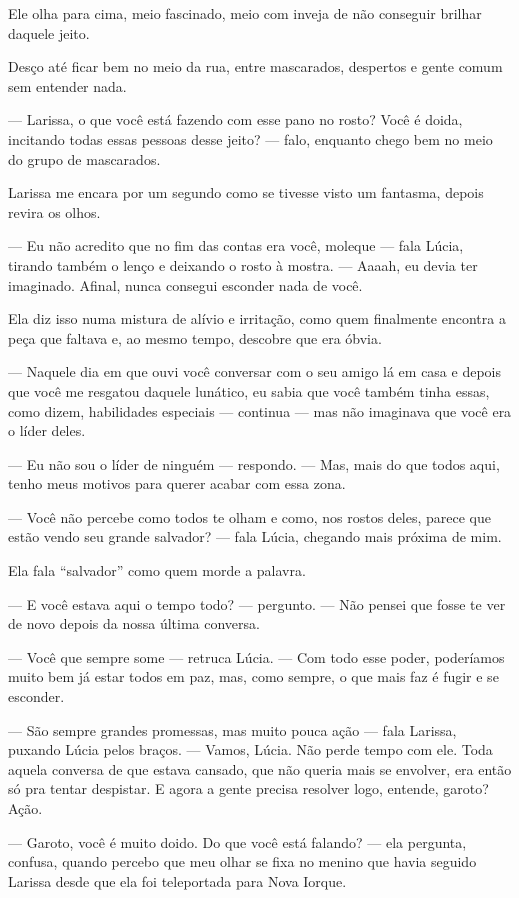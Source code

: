 Ele olha para cima, meio fascinado, meio com inveja de não conseguir brilhar daquele jeito.

\bigskip

Desço até ficar bem no meio da rua, entre mascarados, despertos e gente comum sem entender nada.

— Larissa, o que você está fazendo com esse pano no rosto? Você é doida, incitando todas essas pessoas desse jeito? — falo, enquanto chego bem no meio do grupo de mascarados.

Larissa me encara por um segundo como se tivesse visto um fantasma, depois revira os olhos.

— Eu não acredito que no fim das contas era você, moleque — fala Lúcia, tirando também o lenço e deixando o rosto à mostra. — Aaaah, eu devia ter imaginado. Afinal, nunca consegui esconder nada de você.

Ela diz isso numa mistura de alívio e irritação, como quem finalmente encontra a peça que faltava e, ao mesmo tempo, descobre que era óbvia.

— Naquele dia em que ouvi você conversar com o seu amigo lá em casa e depois que você me resgatou daquele lunático, eu sabia que você também tinha essas, como dizem, habilidades especiais — continua — mas não imaginava que você era o líder deles.

— Eu não sou o líder de ninguém — respondo. — Mas, mais do que todos aqui, tenho meus motivos para querer acabar com essa zona.

— Você não percebe como todos te olham e como, nos rostos deles, parece que estão vendo seu grande salvador? — fala Lúcia, chegando mais próxima de mim.

Ela fala “salvador” como quem morde a palavra.

— E você estava aqui o tempo todo? — pergunto. — Não pensei que fosse te ver de novo depois da nossa última conversa.

— Você que sempre some — retruca Lúcia. — Com todo esse poder, poderíamos muito bem já estar todos em paz, mas, como sempre, o que mais faz é fugir e se esconder.

— São sempre grandes promessas, mas muito pouca ação — fala Larissa, puxando Lúcia pelos braços. — Vamos, Lúcia. Não perde tempo com ele. Toda aquela conversa de que estava cansado, que não queria mais se envolver, era então só pra tentar despistar. E agora a gente precisa resolver logo, entende, garoto? Ação.

— Garoto, você é muito doido. Do que você está falando? — ela pergunta, confusa, quando percebo que meu olhar se fixa no menino que havia seguido Larissa desde que ela foi teleportada para Nova Iorque.

